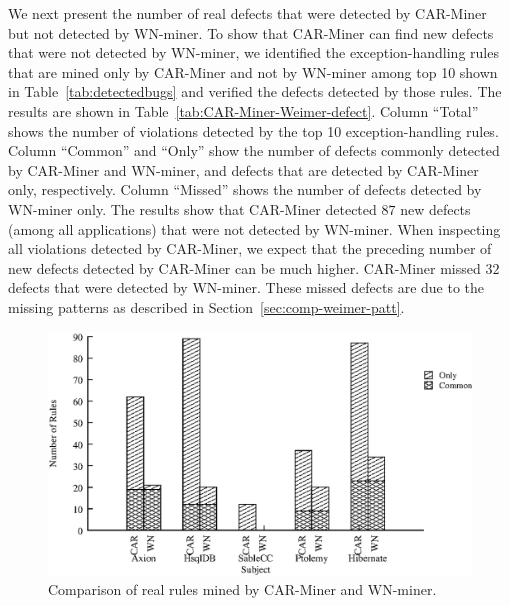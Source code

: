 We next present the number of real defects that were detected by CAR-Miner but not detected by WN-miner. 
To show that CAR-Miner can find new defects that were not detected by WN-miner, we identified
the exception-handling rules that are mined only by CAR-Miner and not by WN-miner
among top 10 shown in Table~\ref{tab:detectedbugs} and verified the defects detected
by those rules. The results are shown in Table~\ref{tab:CAR-Miner-Weimer-defect}.
Column ``Total'' shows the number of violations
detected by the top 10 exception-handling rules. Column ``Common'' and ``Only'' show
the number of defects commonly detected by CAR-Miner and WN-miner, and defects that are detected
by CAR-Miner only, respectively. Column ``Missed'' shows the number of defects
detected by WN-miner only. The results show that CAR-Miner detected $87$ new defects 
(among all applications) that were not detected by WN-miner. 
When inspecting all violations detected by CAR-Miner, we expect that the preceding number
of new defects detected by CAR-Miner can be much higher. 
CAR-Miner missed $32$ defects that were detected by WN-miner. These missed
defects are due to the missing patterns as described in Section~\ref{sec:comp-weimer-patt}.
\begin{figure}[t]
\centering
\includegraphics[scale=0.55,clip]{charts/XWeb-Weimer-Patterns.eps}\vspace*{-3ex}
\caption{\label{chart:xweb-wn-pattern}Comparison of real rules mined by CAR-Miner and WN-miner.}\vspace*{-3ex}
\end{figure}
